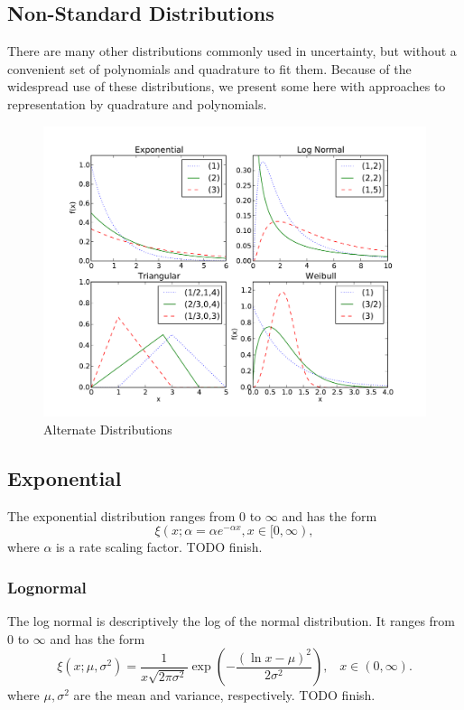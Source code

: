 \subsection{Non-Standard Distributions}
There are many other distributions commonly used in uncertainty, but without a convenient set of polynomials and quadrature to fit them.  Because of the widespread use of these distributions, we present some here with approaches to representation by quadrature and polynomials.
\begin{figure}[h!]
\centering
\includegraphics[width=\linewidth]{./graphics/distros_alt}
\caption{Alternate Distributions}
\label{fig:distros_alt}
\end{figure}
\subsection{Exponential}
The exponential distribution ranges from 0 to $\infty$ and has the form
\begin{equation}
\xi(x;\alpha=\alpha e^{-\alpha x}, x\in [0,\infty),
\end{equation}
where $\alpha$ is a rate scaling factor. TODO finish.

\subsubsection{Lognormal}
The log normal is descriptively the log of the normal distribution.  It ranges from 0 to $\infty$ and has the form
\begin{equation}
\xi(x;\mu,\sigma^2)=\frac{1}{x\sqrt{2\pi\sigma^2}}\exp\left(-\frac{(\ln x-\mu)^2}{2\sigma^2}\right),
  \hspace{10pt} x\in(0,\infty).
\end{equation}
where $\mu,\sigma^2$ are the mean and variance, respectively.  TODO finish.

